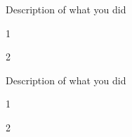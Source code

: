\documentclass[]{deedy-resume-openfont}
\begin{document}
\begin{minipage}[t]{0.66\textwidth}
\begin{tightemize}
\item Description of what you did
\item 1
\item 2
\end{tightemize}
\sectionsep

\begin{tightemize}
\item Description of what you did
\item 1
\item 2
\end{tightemize}
\sectionsep

\end{minipage}
\end{document}
